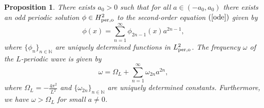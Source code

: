 \documentclass[12pt,reqno]{amsart}
\numberwithin{equation}{section}
\numberwithin{figure}{section}
\newtheorem{proposition}[theorem]{Proposition}
\begin{document}
		\begin{proposition}\label{prop11}
			There exists $a_0>0$ such that for all $a\in (-a_0,a_0)$ there exists an odd periodic solution $\phi \in H^2_{\rm per,o}$ to the second-order equation $(\ref{ode})$ given by
			\begin{equation}
			\label{smallsol1}
				\phi(x) = \sum_{n=1}^{\infty}\phi_{2n-1}(x)a^{2n-1},
			\end{equation}
			where $\{ \phi_n \}_{n \in \mathbb{N}}$ are uniquely determined functions in $L^2_{\rm per,o}$. The frequency $\omega$ of the $L$-periodic wave is given by
			\begin{equation}
			\label{freqwave1}
				\omega = \Omega_L +\sum_{n=1}^{\infty} \omega_{2n} a^{2n},
			\end{equation}
			where $\Omega_L = -\frac{4\pi^2}{L^2}$ and $\{ \omega_{2n} \}_{n \in \mathbb{N}}$ are uniquely determined constants. Furthermore, we have $\omega > \Omega_L$ for small $a \neq 0$.
		\end{proposition}
	
\end{document}
